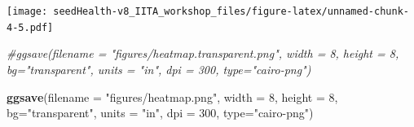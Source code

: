 \documentclass[]{article}
\newenvironment{Shaded}{\begin{snugshade}}{\end{snugshade}}
\newcommand{\KeywordTok}[1]{\textcolor[rgb]{0.13,0.29,0.53}{\textbf{#1}}}
\newcommand{\DataTypeTok}[1]{\textcolor[rgb]{0.13,0.29,0.53}{#1}}
\newcommand{\DecValTok}[1]{\textcolor[rgb]{0.00,0.00,0.81}{#1}}
\newcommand{\StringTok}[1]{\textcolor[rgb]{0.31,0.60,0.02}{#1}}
\newcommand{\CommentTok}[1]{\textcolor[rgb]{0.56,0.35,0.01}{\textit{#1}}}
\newcommand{\NormalTok}[1]{#1}
\begin{document}
\texttt{[image: seedHealth-v8\_IITA\_workshop\_files/figure-latex/unnamed-chunk-4-5.pdf]}

\begin{Shaded}
\begin{Highlighting}[]
\CommentTok{#ggsave(filename = "figures/heatmap.transparent.png", width = 8, height = 8, bg="transparent", units = "in", dpi = 300, type="cairo-png")}

\KeywordTok{ggsave}\NormalTok{(}\DataTypeTok{filename =} \StringTok{"figures/heatmap.png"}\NormalTok{, }\DataTypeTok{width =} \DecValTok{8}\NormalTok{, }\DataTypeTok{height =} \DecValTok{8}\NormalTok{, }\DataTypeTok{bg=}\StringTok{"transparent"}\NormalTok{, }\DataTypeTok{units =} \StringTok{"in"}\NormalTok{, }\DataTypeTok{dpi =} \DecValTok{300}\NormalTok{, }\DataTypeTok{type=}\StringTok{"cairo-png"}\NormalTok{)}
\end{Highlighting}
\end{Shaded}
\end{document}
